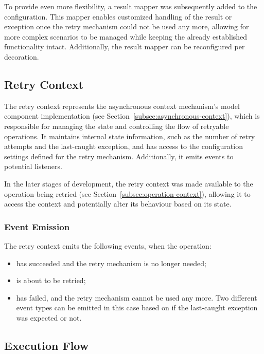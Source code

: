 To provide even more flexibility, a result mapper was subsequently added to the configuration.
This mapper enables customized handling of the result or exception once the retry mechanism could not be used any more,
allowing for more complex scenarios to be managed while keeping the already established functionality intact.
Additionally, the result mapper can be reconfigured per decoration.

\subsection{Retry Context}\label{subsec:retry-context}

The retry context represents the asynchronous context mechanism's model component implementation (see Section~\ref{subsec:asynchronous-context}), which is responsible for managing the state and controlling the flow of retryable operations.
It maintains internal state information, such as the number of retry attempts and the last-caught exception,
and has access to the configuration settings defined for the retry mechanism.
Additionally, it emits events to potential listeners.

In the later stages of development,
the retry context was made available to the operation being retried (see Section~\ref{subsec:operation-context}),
allowing it to access the context and potentially alter its behaviour based on its state.

\subsubsection{Event Emission}\label{subsubsec:retry-context-event-emission}

The retry context emits the following events, when the operation:

\begin{itemize}
    \item has succeeded and the retry mechanism is no longer needed;
    \item is about to be retried;
    \item has failed, and the retry mechanism cannot be used any more.
    Two different event types can be emitted in this case based on if the last-caught exception was expected or not.
\end{itemize}

\subsection{Execution Flow}\label{subsec:retry-execution-flow}

